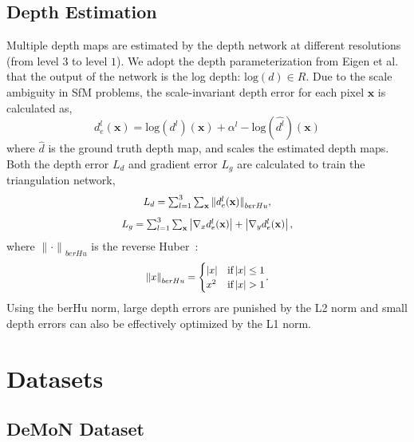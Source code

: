 \documentclass[letterpaper, 10 pt, conference]{ieeeconf}  %
\begin{document}
\subsection{Depth Estimation}
 
Multiple depth maps are estimated by the depth network at different resolutions (from level $3$ to level $1$). We adopt the depth parameterization from Eigen et al.~\cite{mono_depth_2014} that the output of the network is the log depth: $\text{log}(d) \in R$. Due to the scale ambiguity in SfM problems, the scale-invariant depth error for each pixel $\mathbf{x}$ is calculated as,
\begin{equation}
d_{e}^l(\mathbf{x}) = \text{log}(d^l)(\mathbf{x}) + \alpha^l - \text{log}(\hat{d^l})(\mathbf{x})
\end{equation}
where $\hat{d}$ is the ground truth depth map, and  scales the estimated depth maps. Both the depth error $L_{d}$ and gradient error $L_{g}$ are calculated to train the triangulation network,
\begin{equation}
    \scalebox{0.9}{$
L_{d} = \sum_{l=1}^{3} \sum_{\mathbf{x}} { \lVert d_{e}^l(\mathbf{x}) \rVert }_{berHu},
$}
\end{equation}
\begin{equation}
\scalebox{0.9}{$
L_{g} = \sum_{l=1}^{3} \sum_{\mathbf{x}} \left| \nabla_x d_{e}^l(\mathbf{x}) \right| + \left| \nabla_y d_{e}^l(\mathbf{x}) \right|,
$}
\end{equation}
where ${ \lVert \cdot \rVert }_{berHu}$ is the reverse Huber~\cite{fcrn_mono_depth, berhu_loss}:
\begin{equation}
\scalebox{0.9}{$
    { \lVert x \rVert }_{berHu} =
\begin{cases} 
\left| x \right| & \text{if}\left| x \right| \leq 1\\
x^2 & \text{if}\left| x \right| > 1
\end{cases}$}.
\end{equation}
Using the berHu norm, large depth errors are punished by the L2 norm and small depth errors can also be effectively optimized by the L1 norm.
 
 
\section{Datasets}
\subsection{DeMoN Dataset}
 
\end{document}
